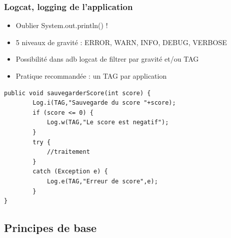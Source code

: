 \documentclass{beamer}
\begin{document}
\begin{frame}[fragile]
\frametitle{Logcat, logging de l'application}
\begin{itemize}
  \item Oublier System.out.println() !
  \item 5 niveaux de gravité : ERROR, WARN, INFO, DEBUG, VERBOSE
  \item Possibilité dans adb logcat de filtrer par gravité et/ou TAG
  \item Pratique recommandée : un TAG par application
 \end{itemize}
 \begin{lstlisting}
public void sauvegarderScore(int score) {
        Log.i(TAG,"Sauvegarde du score "+score);
        if (score <= 0) {
            Log.w(TAG,"Le score est negatif");
        }
        try {
            //traitement
        }
        catch (Exception e) {
        	Log.e(TAG,"Erreur de score",e);
        }
}
\end{lstlisting}
\end{frame}
\subsection{Principes de base}
\end{document}
